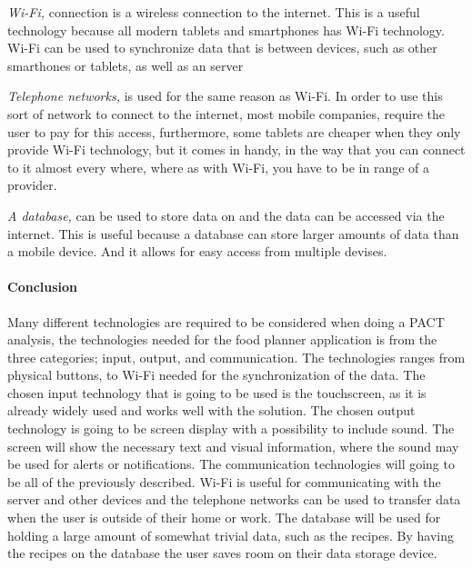 \emph{Wi-Fi,} connection is a wireless connection to the internet.
This is a useful technology because all modern tablets and smartphones has Wi-Fi technology.
Wi-Fi can be used to synchronize data that is between devices, such as other smarthones or tablets, as well as an server

\emph{Telephone networks,} is used for the same reason as Wi-Fi. In order to use this sort of network to connect to the internet, most mobile companies, require the user to pay for this access, furthermore, some tablets are cheaper when they only provide Wi-Fi technology, but it comes in handy, in the way that you can connect to it almost every where, where as with Wi-Fi, you have to be in range of a provider.

\emph{A database,} can be used to store data on and the data can be accessed via the internet. This is useful because a database can store larger amounts of data than a mobile device. And it allows for easy access from multiple devises.
 
\paragraph{Conclusion}
Many different technologies are required to be considered when doing a PACT analysis, the technologies needed for the food planner application is from the three categories; input, output, and communication.
The technologies ranges from physical buttons, to Wi-Fi needed for the synchronization of the data. The chosen input technology that is going to be used is the touchscreen, as it is already widely used and works well with the solution. The chosen output technology is going to be screen display with a possibility  to include sound. The screen will show the necessary text and visual information, where the sound may be used for alerts or notifications. The communication technologies will going to be all of the previously described. Wi-Fi is useful for communicating with the server and other devices and the telephone networks can be used to transfer data when the user is outside of their home or work. The database will be used for holding a large amount of somewhat trivial data, such as the recipes. By having the recipes on the database the user saves room on their data storage device.